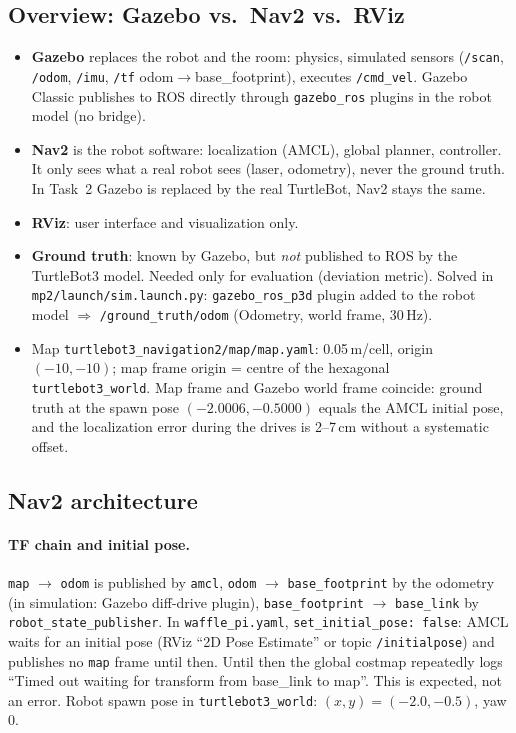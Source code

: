 \documentclass[10pt]{article}
\newcommand{\pkg}[1]{\texttt{#1}}
\begin{document}
\subsection{Overview: Gazebo vs.\ Nav2 vs.\ RViz}
\begin{itemize}
  \item \textbf{Gazebo} replaces the robot and the room: physics, simulated sensors
        (\pkg{/scan}, \pkg{/odom}, \pkg{/imu}, \pkg{/tf} odom$\rightarrow$base\_footprint), executes \pkg{/cmd\_vel}.
        Gazebo Classic publishes to ROS directly through \pkg{gazebo\_ros} plugins in the robot model (no bridge).
  \item \textbf{Nav2} is the robot software: localization (AMCL), global planner, controller.
        It only sees what a real robot sees (laser, odometry), never the ground truth.
        In Task~2 Gazebo is replaced by the real TurtleBot, Nav2 stays the same.
  \item \textbf{RViz}: user interface and visualization only.
  \item \textbf{Ground truth}: known by Gazebo, but \emph{not} published to ROS by the TurtleBot3 model.
        Needed only for evaluation (deviation metric). Solved in \pkg{mp2/launch/sim.launch.py}: \pkg{gazebo\_ros\_p3d}
        plugin added to the robot model $\Rightarrow$ \pkg{/ground\_truth/odom} (Odometry, world frame, 30\,Hz).
  \item Map \pkg{turtlebot3\_navigation2/map/map.yaml}: 0.05\,m/cell, origin $(-10,-10)$;
        map frame origin = centre of the hexagonal \pkg{turtlebot3\_world}.
        Map frame and Gazebo world frame coincide: ground truth at the spawn pose $(-2.0006, -0.5000)$ equals the
        AMCL initial pose, and the localization error during the drives is 2--7\,cm without a systematic offset.
\end{itemize}

\subsection{Nav2 architecture}
\paragraph{TF chain and initial pose.} \pkg{map} $\rightarrow$ \pkg{odom} is published by \pkg{amcl},
\pkg{odom} $\rightarrow$ \pkg{base\_footprint} by the odometry (in simulation: Gazebo diff-drive plugin),
\pkg{base\_footprint} $\rightarrow$ \pkg{base\_link} by \pkg{robot\_state\_publisher}.
In \pkg{waffle\_pi.yaml}, \pkg{set\_initial\_pose: false}: AMCL waits for an initial pose
(RViz ``2D Pose Estimate'' or topic \pkg{/initialpose}) and publishes no \pkg{map} frame
until then. Until then the global costmap repeatedly logs
``Timed out waiting for transform from base\_link to map''. This is expected, not an error.
Robot spawn pose in \pkg{turtlebot3\_world}: $(x,y) = (-2.0, -0.5)$, yaw 0.
\end{document}
